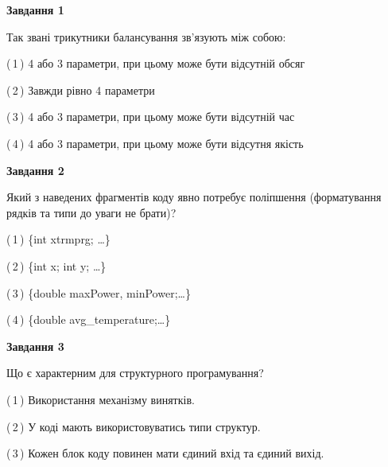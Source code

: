 \documentclass[10pt, ukrainian]{article}
\begin{document}
{
\begin {large}
{\begin {center}\textbf{Завдання 1}\end {center}}\par
Так звані трикутники балансування зв'язують між собою:\par
\vspace{2mm}



(\,1\,) 4 або 3 параметри, при цьому може бути відсутній обсяг %



(\,2\,) Завжди рівно 4 параметри%



(\,3\,) 4 або 3 параметри, при цьому може бути відсутній час%



(\,4\,) 4 або 3 параметри, при цьому може бути відсутня якість%


{\begin {center}\textbf{Завдання 2}\end {center}}\par
Який з наведених фрагментів коду явно потребує поліпшення (форматування рядків та типи до уваги не брати)?\par
\vspace{2mm}



(\,1\,) \{int xtrmprg; …\}%



(\,2\,) \{int x; int y; …\}%



(\,3\,) \{double maxPower, minPower;…\} %



(\,4\,) \{double avg\_temperature;…\} %


{\begin {center}\textbf{Завдання 3}\end {center}}\par
Що є характерним для структурного програмування?\par
\vspace{2mm}



(\,1\,) Використання механізму винятків. %



(\,2\,) У коді мають використовуватись типи структур. %



(\,3\,) Кожен блок коду повинен мати єдиний вхід та єдиний вихід.%




\end{large}}
\end{document}
